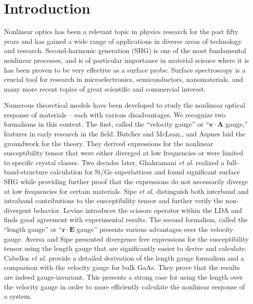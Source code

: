 \section{Introduction}\label{intro}


Nonlinear optics has been a relevant topic in physics research for the past 
fifty years and has gained a wide range of applications in 
diverse areas of technology and research. Second-harmonic generation (SHG) is
one of the most fundamental nonlinear processes, and is of particular 
importance in material science where it is has been proven to be very 
effective as a surface probe. \cite{hughesPRB96, guyot-sionnestPRB88, 
lupkeSSR99, downerPSSA01, shenAPB99, shenNAT89, chenPRL81, 
maytorenaPRB98} Surface spectroscopy is a crucial tool for research in 
microelectronics, semiconductors, nanomaterials, and many more recent 
topics of great scientific and commercial interest.

Numerous theoretical models have been developed to study the nonlinear optical
response of materials -- each with various disadvantages. We recognize two 
formalisms in this context. The first, called the ``velocity gauge'' or 
``$\mathbf{v}\cdot\mathbf{A}$ gauge,'' features in early research in the field. 
Butcher and McLean,\cite{butcherPOPS63}, and Aspnes\cite{aspnesPRB72} laid the 
groundwork for the theory. They derived expressions for the nonlinear 
susceptibility tensor that were either diverged at low frequencies or were 
limited to specific crystal classes. Two decades later, 
Ghahramani \emph{et al}.\cite{ghahramaniPRB91} realized a full-band-structure 
calculation for Si/Ge superlattices and found significant surface SHG 
while providing further proof that the expressions do not necessarily diverge 
at low frequencies for certain materials. Sipe \emph{et al}.\cite{sipePRB93}
distinguish both interband and intraband contributions to the susceptibility 
tensor and further verify the non-divergent behavior. Levine\cite{levinePRB94} 
introduces the scissors operator within the LDA and finds good agreement 
with experimental results. The second formalism, called the ``length gauge'' 
or ``$\mathbf{r}\cdot\mathbf{E}$ gauge'' presents various advantages over 
the velocity gauge. Aversa and Sipe\cite{aversaPRB95} presented divergence 
free expressions for the susceptibility tensor using the length gauge that 
are  significantly easier to derive and calculate. Cabellos \emph{et al}.
\cite{cabellosPRB09} provide a detailed derivation of the length gauge 
formalism and a comparison with the velocity gauge for bulk GaAs. They 
prove that the results are indeed gauge-invariant. This presents a strong
case for using the length over the velocity gauge in order to more 
efficiently calculate the nonlinear response of a system.

